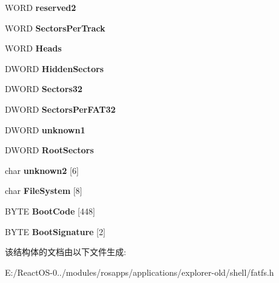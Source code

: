 \begin{DoxyCompactItemize}
\mbox{\label{struct_boot_sector32_a58977d5cc7cb3cd4bc2e986381bf7e29}} 
W\+O\+RD {\bfseries reserved2}
\item 
\mbox{\label{struct_boot_sector32_a19371a92fd92c7e2bb1d924c04fc23f7}} 
W\+O\+RD {\bfseries Sectors\+Per\+Track}
\item 
\mbox{\label{struct_boot_sector32_abac2a0f7a8a0ea6dfee16aa1a0aa598d}} 
W\+O\+RD {\bfseries Heads}
\item 
\mbox{\label{struct_boot_sector32_aef45c6b2ad534a7c122233b01f1b7892}} 
D\+W\+O\+RD {\bfseries Hidden\+Sectors}
\item 
\mbox{\label{struct_boot_sector32_a53809922605d9c4e1cee1dd0cbf80779}} 
D\+W\+O\+RD {\bfseries Sectors32}
\item 
\mbox{\label{struct_boot_sector32_a0474573ad0ec3c339d5df51ac058da1e}} 
D\+W\+O\+RD {\bfseries Sectors\+Per\+F\+A\+T32}
\item 
\mbox{\label{struct_boot_sector32_a427df564894d167cb4396b70b6624912}} 
D\+W\+O\+RD {\bfseries unknown1}
\item 
\mbox{\label{struct_boot_sector32_a92a37111457f6a5573578c46fca8fc3f}} 
D\+W\+O\+RD {\bfseries Root\+Sectors}
\item 
\mbox{\label{struct_boot_sector32_aa11facebbed79310371510bec3d04373}} 
char {\bfseries unknown2} \mbox{[}6\mbox{]}
\item 
\mbox{\label{struct_boot_sector32_a36cdfa342484ed220d90e8957a4fc36f}} 
char {\bfseries File\+System} \mbox{[}8\mbox{]}
\item 
\mbox{\label{struct_boot_sector32_a5a85a6391bd4ed2792fc6b43cdbcd68f}} 
B\+Y\+TE {\bfseries Boot\+Code} \mbox{[}448\mbox{]}
\item 
\mbox{\label{struct_boot_sector32_a2c9a740b0ce81d7a8104559c00a9aa10}} 
B\+Y\+TE {\bfseries Boot\+Signature} \mbox{[}2\mbox{]}
\end{DoxyCompactItemize}


该结构体的文档由以下文件生成\+:\begin{DoxyCompactItemize}
\item 
E\+:/\+React\+O\+S-\/0../modules/rosapps/applications/explorer-\/old/shell/fatfs.\+h\end{DoxyCompactItemize}
